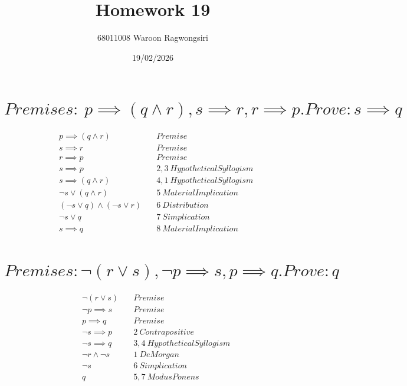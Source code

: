 \documentclass{article}
\title{Homework 19}
\author{68011008 Waroon Ragwongsiri}
\date{19/02/2026}
\begin{document}
\maketitle

{\small
\section{$Premises: \ p \implies ( q \land r), s \implies r,r  \implies p. Prove: s \implies q$}
}
\begin{align}
	&p \implies (q \land r) \quad & Premise \\
	&s \implies r \quad & Premise \\
	&r \implies p \quad & Premise \\
	&s \implies p \quad & 2,3 \ Hypothetical Syllogism \\
	&s \implies (q \land r) \quad & 4,1 \ Hypothetical Syllogism \\
	&\neg s \lor (q \land r) \quad & 5 \ Material Implication \\
	&(\neg s \lor q) \land (\neg s \lor r) \quad & 6 \ Distribution \\
	&\neg s \lor q \quad & 7 \ Simplication \\
	&s \implies q \quad & 8 \ Material Implication
\end{align}

\break

{\small
\section{$Premises: \neg (r \lor s), \neg p \implies s, p \implies q. Prove: q$}
}
\begin{align}
	&\neg (r \lor s) \quad & Premise \\
	&\neg p \implies s \quad & Premise \\
	&p \implies q \quad & Premise \\
	&\neg s \implies p \quad & 2 \ Contrapositive \\
	&\neg s \implies q \quad & 3,4 \ Hypothetical Syllogism \\
	&\neg r \land \neg s \quad & 1 \ De Morgan \\
	&\neg s \quad & 6 \ Simplication \\
	&q \quad & 5,7 \ Modus Ponens
\end{align}
\end{document}
